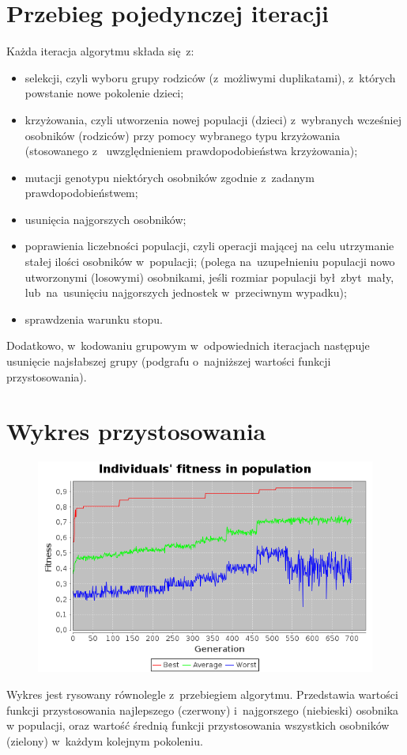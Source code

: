 \documentclass[11pt]{aghdpl}
\begin{document}
\section{Przebieg pojedynczej iteracji}
\label{sec:singleLifeCycle}
Każda iteracja algorytmu składa się~z:
\begin{itemize}[noitemsep]
 \item selekcji, czyli wyboru grupy rodziców (z~możliwymi duplikatami), z~których powstanie nowe pokolenie dzieci;
 \item krzyżowania, czyli utworzenia nowej populacji (dzieci) z~wybranych wcześniej osobników (rodziców) przy pomocy wybranego typu krzyżowania (stosowanego z~
 uwzględnieniem prawdopodobieństwa krzyżowania);
 \item mutacji genotypu niektórych osobników zgodnie z~zadanym prawdopodobieństwem;
 \item usunięcia najgorszych osobników;
 \item poprawienia liczebności populacji, czyli operacji mającej na celu utrzymanie stałej ilości osobników w~populacji;
 (polega na~uzupełnieniu populacji nowo utworzonymi (losowymi) osobnikami, jeśli rozmiar populacji był~zbyt~mały, lub~na~usunięciu
 najgorszych jednostek w~przeciwnym wypadku);
 \item sprawdzenia warunku stopu.
\end{itemize}
Dodatkowo, w~kodowaniu grupowym w~odpowiednich iteracjach następuje usunięcie najsłabszej grupy (podgrafu o~najniższej wartości funkcji przystosowania).

\section{Wykres przystosowania}
\label{sec:chart}
\begin{figure}[ht]
\includegraphics[width=16cm]{chart} 
\end{figure}
Wykres jest rysowany równolegle z~przebiegiem algorytmu. Przedstawia wartości funkcji przystosowania najlepszego (czerwony) i~najgorszego
(niebieski) osobnika w populacji, oraz wartość średnią funkcji przystosowania wszystkich osobników (zielony) w~każdym kolejnym pokoleniu.
\vspace*{100mm}
\end{document}
